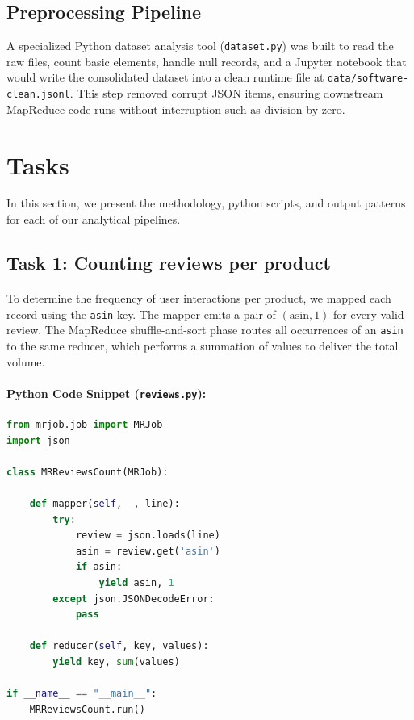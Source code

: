 \documentclass[12pt, a4paper]{article}
\begin{document}
	\subsection{Preprocessing Pipeline}
	A specialized Python dataset analysis tool (\texttt{dataset.py}) was built to read the raw files, count basic elements, handle null records, and a Jupyter notebook that would write the consolidated dataset into a clean runtime file at \texttt{data/software-clean.jsonl}. This step removed corrupt JSON items, ensuring downstream MapReduce code runs without interruption such as division by zero.
	
	\section{Tasks}
	
	In this section, we present the methodology, python scripts, and output patterns for each of our analytical pipelines.
	
	\subsection{Task 1: Counting reviews per product}
	\paragraph{} 
	To determine the frequency of user interactions per product, we mapped each record using the \texttt{asin} key. The mapper emits a pair of $(\text{asin}, 1)$ for every valid review. The MapReduce shuffle-and-sort phase routes all occurrences of an \texttt{asin} to the same reducer, which performs a summation of values to deliver the total volume.
	
	\paragraph{Python Code Snippet (\texttt{reviews.py}):}
	\begin{lstlisting}[language=Python, caption={MapReduce program to count reviews per product.}]
from mrjob.job import MRJob
import json

class MRReviewsCount(MRJob):

	def mapper(self, _, line):
		try:
			review = json.loads(line)
			asin = review.get('asin')
			if asin:
				yield asin, 1
		except json.JSONDecodeError:
			pass
	
	def reducer(self, key, values):
		yield key, sum(values)
	
if __name__ == "__main__":
	MRReviewsCount.run()
	\end{lstlisting}
	
\end{document}
